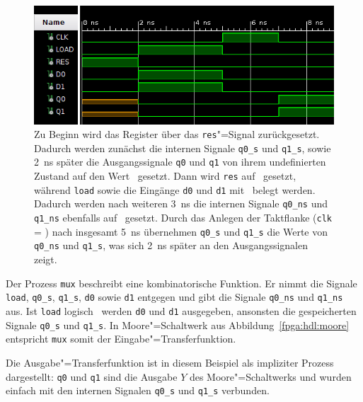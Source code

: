 \begin{figure}[htb]
    \centering
    \includegraphics[width=\textwidth]{reg2_waveform.png}
    \caption[Verhalten des 2-Bit-Registers]{Zu Beginn wird das Register über
             das \texttt{res}"=Signal zurückgesetzt. Dadurch werden zunächst die
             internen Signale \texttt{q0\_s} und \texttt{q1\_s}, sowie
             \SI{2}{\nano\second} später die Ausgangssignale \texttt{q0} und
             \texttt{q1} von ihrem undefinierten Zustand auf den Wert
             \grqq\ gesetzt. Dann wird \texttt{res} auf \grqq\
             gesetzt, während \texttt{load} sowie die Eingänge \texttt{d0} und
             \texttt{d1} mit \glqq 1\grqq\ belegt werden. Dadurch werden nach
             weiteren \SI{3}{\nano\second} die internen Signale \texttt{q0\_ns}
             und \texttt{q1\_ns} ebenfalls auf \grqq\ gesetzt. Durch das
             Anlegen der Taktflanke (\texttt{clk} = \glqq 1\grqq) nach insgesamt
             \SI{5}{\nano\second} übernehmen \texttt{q0\_s} und \texttt{q1\_s}
             die Werte von \texttt{q0\_ns} und \texttt{q1\_s}, was sich
             \SI{2}{\nano\second} später an den Ausgangssignalen zeigt.}
    \label{fpga:hdl:waveform}
\end{figure}

Der Prozess \texttt{mux} beschreibt eine kombinatorische Funktion. Er
nimmt die Signale \texttt{load}, \texttt{q0\_s}, \texttt{q1\_s},
\texttt{d0} sowie \texttt{d1} entgegen und gibt die Signale \texttt{q0\_ns} und
\texttt{q1\_ns} aus. Ist \texttt{load} logisch \glqq 1\grqq\, werden \texttt{d0}
und \texttt{d1} ausgegeben, ansonsten die gespeicherten Signale \texttt{q0\_s}
und \texttt{q1\_s}. In Moore"=Schaltwerk aus Abbildung~\ref{fpga:hdl:moore}
entspricht \texttt{mux} somit der Eingabe"=Transferfunktion.
\cite[vgl.][31]{kesel2013}

Die Ausgabe"=Transferfunktion ist in diesem Beispiel als impliziter Prozess
dargestellt: \texttt{q0} und \texttt{q1} sind die Ausgabe $Y$ des
Moore"=Schaltwerks und wurden einfach mit den internen Signalen \texttt{q0\_s}
und \texttt{q1\_s} verbunden.
\cite[vgl.][31]{kesel2013}


